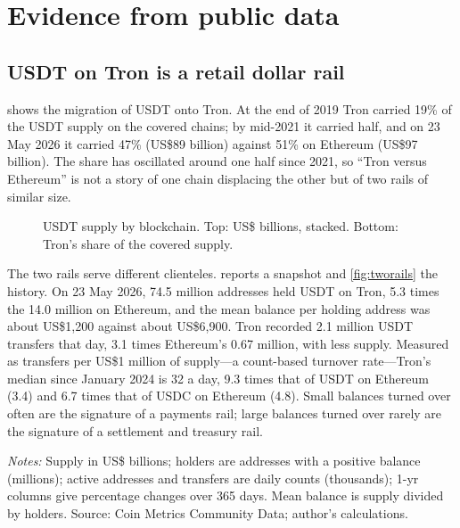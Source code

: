 \section{Evidence from public data}\label{sec:evidence}

\subsection{USDT on Tron is a retail dollar rail}\label{sec:rails}

 shows the migration of USDT onto Tron. At the end of 2019 Tron carried 19\% of the USDT supply on the
covered chains; by mid-2021 it carried half, and on 23 May 2026 it carried 47\% (US\$89 billion) against 51\% on
Ethereum (US\$97 billion). The share has oscillated around one half since 2021, so ``Tron versus Ethereum'' is not a
story of one chain displacing the other but of two rails of similar size.

\begin{figure}[!htbp]
\centering
{}
\caption{USDT supply by blockchain. Top: US\$ billions, stacked. Bottom: Tron's share of the covered supply.}
\label{fig:supply}
\end{figure}

The two rails serve different clienteles.  reports a snapshot and \cref{fig:tworails} the history. On
23 May 2026, 74.5 million addresses held USDT on Tron, 5.3 times the 14.0 million on Ethereum, and the mean balance per
holding address was about US\$1,200 against about US\$6,900. Tron recorded 2.1 million USDT transfers that day, 3.1
times Ethereum's 0.67 million, with less supply. Measured as transfers per US\$1 million of supply---a count-based
turnover rate---Tron's median since January 2024 is 32 a day, 9.3 times that of USDT on Ethereum (3.4) and 6.7 times
that of USDC on Ethereum (4.8). Small balances turned over often are the signature of a payments rail; large balances
turned over rarely are the signature of a settlement and treasury rail.

\begin{table}[!htbp]
\centering\small
\begin{threeparttable}
\caption{On-chain snapshot of the main dollar-stablecoin rails, 23 May 2026}
\label{tab:onchain}

\begin{tablenotes}[flushleft]\footnotesize
\item \emph{Notes:} Supply in US\$ billions; holders are addresses with a positive balance (millions); active addresses
and transfers are daily counts (thousands); 1-yr columns give percentage changes over 365 days. Mean balance is supply
divided by holders. Source: Coin Metrics Community Data; author's calculations.
\end{tablenotes}
\end{threeparttable}
\end{table}

